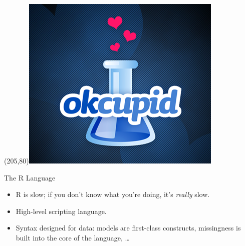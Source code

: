 \begin{frame}
\Put(205,80){\includegraphics[scale=.15]{../common/pics/R_using_logos/okcupid}}
\end{frame}






\begin{frame}
\begin{block}{The R Language}\pause
\begin{itemize}
  \item R is slow; if you don't know what you're doing, it's \emph{really} slow.
  \item High-level scripting language.
  \item Syntax designed for data: models are first-class constructs, 
missingness is built into the core of the language, \dots
\end{itemize}
\end{block}
\end{frame}



